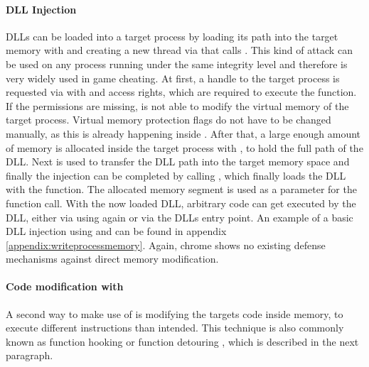 \paragraph{ DLL Injection}
DLLs can be loaded into a target process by loading its path into the target memory with  and creating a new thread via  that calls . This kind of attack can be used on any process running under the same integrity level and therefore is very widely used in game cheating. At first, a handle to the target process is requested via  with  and  access rights, which are required to execute the  function. If the permissions are missing,  is not able to modify the virtual memory of the target process. Virtual memory protection flags do not have to be changed manually, as this is already happening inside . After that, a large enough amount of memory is allocated inside the target process with , to hold the full path of the DLL. Next  is used to transfer the DLL path into the target memory space and finally the injection can be completed by calling , which finally loads the DLL with the  function. The allocated memory segment is used as a parameter for the  function call. With the now loaded DLL, arbitrary code can get executed by the DLL, either via using  again or via the DLLs entry point.
An example of a basic DLL injection using  and  can be found in appendix \ref{appendix:writeprocessmemory}. Again, chrome shows no existing defense mechanisms against direct memory modification.

\paragraph{Code modification with }
A second way to make use of  is modifying the targets code inside memory, to execute different instructions than intended. This technique is also commonly known as function hooking or function detouring \cite{codeproject_hooking}, which is described in the next paragraph. 

